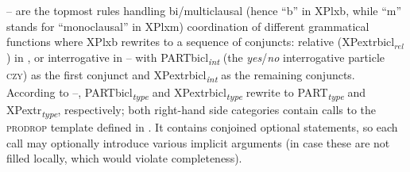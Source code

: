 \documentclass[output=paper]{../langscibook}
\begin{document}
\begin{sloppypar}
\noindent{}– are the topmost
rules handling bi/multiclausal (hence ``b'' in
XPlxb, while ``m'' stands for ``monoclausal'' in XPlxm) coordination of different grammatical
functions where XPlxb rewrites to a sequence of conjuncts: relative
(XPextrbicl$_{rel}$) in , or interrogative
in  – with PARTbicl\textsubscript{\textit{int}} (the
\emph{yes}/\emph{no} interrogative particle \textsc{czy}) as the first
conjunct and XPextrbicl\textsubscript{\textit{int}} as the remaining conjuncts. According
to –, PARTbicl\textsubscript{\textit{type}}
and XPextrbicl\textsubscript{\textit{type}} rewrite to PART\textsubscript{\textit{type}} and XPextr\textsubscript{\textit{type}},
respectively; both right-hand side categories contain calls to the
\textsc{prodrop} template defined in
. It contains conjoined optional
statements, so each call may optionally introduce various implicit arguments (in
case these are not filled locally, which would violate completeness).
\end{sloppypar}
\end{document}
